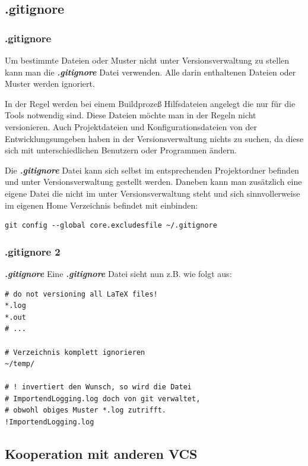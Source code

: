 \documentclass{beamer}
\begin{document}
\subsection{.gitignore}

\begin{frame}[fragile]\frametitle{.gitignore}
\begin{footnotesize}
Um bestimmte Dateien oder Muster nicht unter Versionsverwaltung zu stellen kann man die \textbf{\textit{.gitignore}} Datei verwenden. Alle darin enthaltenen Dateien oder Muster werden ignoriert.

In der Regel werden bei einem Buildprozeß Hilfsdateien angelegt die nur für die Tools notwendig sind. Diese Dateien möchte man in der Regeln nicht versionieren. Auch Projektdateien und Konfigurationsdateien von der Entwicklungsumgeben haben in der Versionsverwaltung nichts zu suchen, da diese sich mit unterschiedlichen Benutzern oder Programmen ändern. 

Die \textbf{\textit{.gitignore}} Datei kann sich selbst im entsprechenden Projektordner 
befinden und unter Versionsverwaltung gestellt werden. Daneben kann man zusätzlich
eine eigene Datei die nicht im unter Versionsverwaltung steht und sich sinnvollerweise im eigenen Home
Verzeichnis befindet mit einbinden: 
\end{footnotesize}
\begin{lstlisting}
git config --global core.excludesfile ~/.gitignore
\end{lstlisting}
\end{frame}

\begin{frame}[fragile]\frametitle{.gitignore 2}
\begin{block} {\textbf{\textit{.gitignore}}}
Eine \textbf{\textit{.gitignore}} Datei sieht nun z.B. wie folgt aus:
\begin{lstlisting}[mathescape=true]
# do not versioning all LaTeX files!
*.log
*.out
# ...

# Verzeichnis komplett ignorieren
~/temp/

# ! invertiert den Wunsch, so wird die Datei 
# ImportendLogging.log doch von git verwaltet, 
# obwohl obiges Muster *.log zutrifft. 
!ImportendLogging.log
\end{lstlisting}
\end{block}
\end{frame}

\subsection{Kooperation mit anderen VCS}
\end{document}
